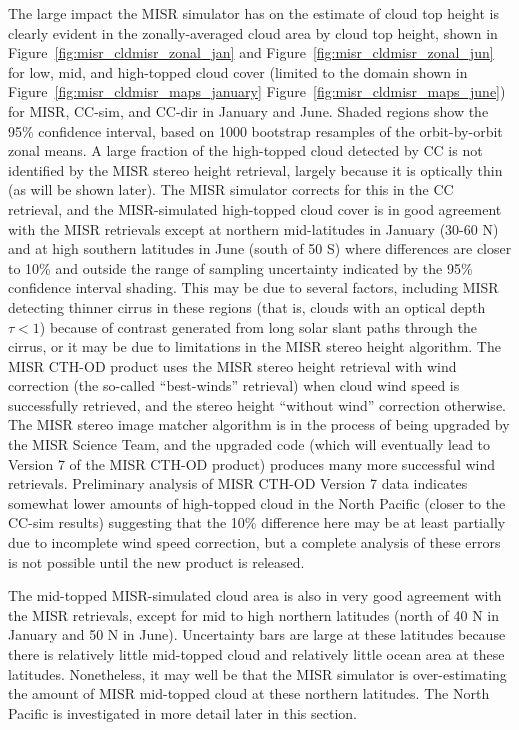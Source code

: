 The large impact the MISR simulator has on the estimate of cloud top
height is clearly evident in the zonally-averaged cloud area by cloud
top height, shown in Figure~\ref{fig:misr_cldmisr_zonal_jan} and
Figure~\ref{fig:misr_cldmisr_zonal_jun} for low, mid, and high-topped
cloud cover (limited to the domain shown in
Figure~\ref{fig:misr_cldmisr_maps_january}
Figure~\ref{fig:misr_cldmisr_maps_june}) for MISR, CC-sim, and CC-dir in
January and June. Shaded regions show the 95\% confidence interval,
based on 1000 bootstrap resamples of the orbit-by-orbit zonal means. A
large fraction of the high-topped cloud detected by CC is not identified
by the MISR stereo height retrieval, largely because it is optically
thin (as will be shown later). The MISR simulator corrects for this in
the CC retrieval, and the MISR-simulated high-topped cloud cover is in
good agreement with the MISR retrievals except at northern mid-latitudes
in January (30-60 N) and at high southern latitudes in June (south of 50
S) where differences are closer to 10\% and outside the range of
sampling uncertainty indicated by the 95\% confidence interval shading.
This may be due to several factors, including MISR detecting thinner
cirrus in these regions (that is, clouds with an optical depth
\(\tau < 1\)) because of contrast generated from long solar slant paths
through the cirrus, or it may be due to limitations in the MISR stereo
height algorithm. The MISR CTH-OD product uses the MISR stereo height
retrieval with wind correction (the so-called ``best-winds'' retrieval)
when cloud wind speed is successfully retrieved, and the stereo height
``without wind'' correction otherwise. The MISR stereo image matcher
algorithm is in the process of being upgraded by the MISR Science Team,
and the upgraded code (which will eventually lead to Version 7 of the
MISR CTH-OD product) produces many more successful wind retrievals.
Preliminary analysis of MISR CTH-OD Version 7 data indicates somewhat
lower amounts of high-topped cloud in the North Pacific (closer to the
CC-sim results) suggesting that the 10\% difference here may be at least
partially due to incomplete wind speed correction, but a complete
analysis of these errors is not possible until the new product is
released.

The mid-topped MISR-simulated cloud area is also in very good agreement
with the MISR retrievals, except for mid to high northern latitudes
(north of 40 N in January and 50 N in June). Uncertainty bars are large
at these latitudes because there is relatively little mid-topped cloud
and relatively little ocean area at these latitudes. Nonetheless, it may
well be that the MISR simulator is over-estimating the amount of MISR
mid-topped cloud at these northern latitudes. The North Pacific is
investigated in more detail later in this section.

